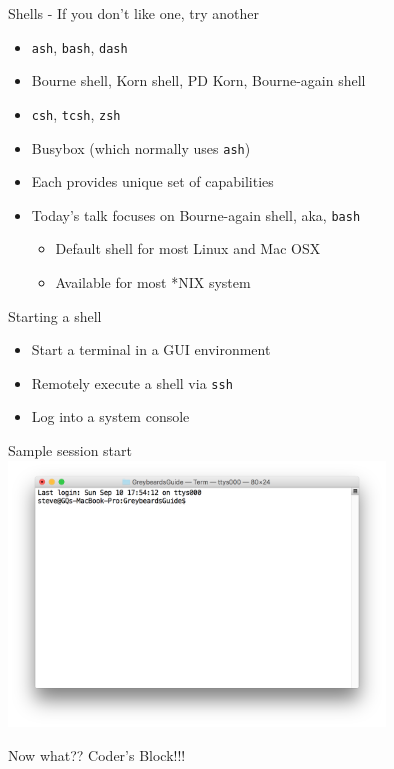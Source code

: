 \documentclass[t]{beamer}
\begin{document}
\begin{frame}{Shells - If you don't like one, try another}
  \begin{itemize}
  \item \texttt{ash}, \texttt{bash}, \texttt{dash}
    \pause
  \item Bourne shell, Korn shell, PD Korn,  Bourne-again shell
    \pause
  \item \texttt{csh}, \texttt{tcsh}, \texttt{zsh}
    \pause
  \item Busybox (which normally uses \texttt{ash})
    \pause
  \item Each provides unique set of capabilities
    \pause
  \item Today's talk focuses on Bourne-again shell, aka, \texttt{bash}
    \begin{itemize}
    \item Default shell for most Linux and Mac OSX
      \item Available for most *NIX system
    \end{itemize}
  \end{itemize}
  \note{}
\end{frame}

\begin{frame}{Starting a shell}
  \begin{itemize}
  \item Start a terminal in a GUI environment
  \item Remotely execute a shell via \texttt{ssh}
  \item Log into a system console
  \end{itemize}
  \note{}
\end{frame}

\begin{frame}{Sample session start}
  \includegraphics[width=10cm,scale=0.4]{images/newtty-1.png}

  Now what?? Coder's Block!!!
  \note{}
\end{frame}
\end{document}
